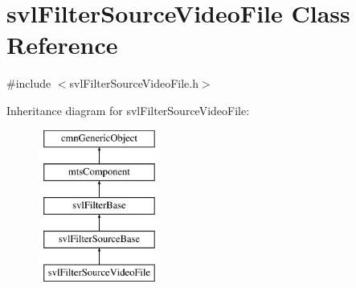 \hypertarget{classsvl_filter_source_video_file}{}\section{svl\+Filter\+Source\+Video\+File Class Reference}
\label{classsvl_filter_source_video_file}


{\ttfamily \#include $<$svl\+Filter\+Source\+Video\+File.\+h$>$}

Inheritance diagram for svl\+Filter\+Source\+Video\+File\+:\begin{figure}[H]
\begin{center}
\leavevmode
\includegraphics[height=5.000000cm]{d9/d4f/classsvl_filter_source_video_file}
\end{center}
\end{figure}
